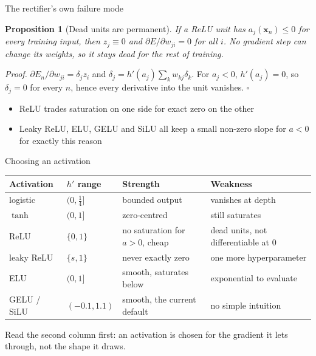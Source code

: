 \documentclass[aspectratio=169, 11pt]{beamer}
\newtheorem{propx}[theorem]{Proposition}
\newcommand{\src}[3]{}      %
\newcommand{\nosrc}{}       %
\begin{document}
\begin{frame}{The rectifier's own failure mode}
  \src{bishop2024}{section}{6.2.3}
  \vspace{0.2em}
  \begin{propx}[Dead units are permanent]
    {\small If a ReLU unit has $a_j(\mathbf{x}_n)\leq 0$ for
    \alert{every} training input, then $z_j\equiv 0$ and
    $\partial E/\partial w_{ji}=0$ for all $i$. No gradient step can
    change its weights, so it stays dead for the rest of training.}
  \end{propx}
  \vspace{0.2em}
  {\footnotesize
  \emph{Proof.} $\partial E_n/\partial w_{ji}
  = \delta_j z_i$ and $\delta_j = h'(a_j)\sum_k w_{kj}\delta_k$.
  For $a_j<0$, $h'(a_j)=0$, so $\delta_j=0$ for every $n$, hence every
  derivative into the unit vanishes. \hfill$\square$}
  \vspace{0.3em}
  {\small
  \begin{itemize}\setlength{\itemsep}{3pt}
    \item ReLU trades \alert{saturation on one side} for
          \alert{exact zero on the other}
    \item Leaky ReLU, ELU, GELU and SiLU all keep a small non-zero
          slope for $a<0$ for exactly this reason
  \end{itemize}}
\end{frame}

\begin{frame}{Choosing an activation}
  \nosrc
  \vspace{0.05em}
  \centering
  \renewcommand{\arraystretch}{1.25}
  {\footnotesize
  \begin{tabular}{p{} p{}
                  p{} p{}}
    \textbf{Activation} & \textbf{$h'$ range} & \textbf{Strength}
      & \textbf{Weakness}\\
    \hline
    logistic & $(0,\tfrac14]$ & bounded output
      & vanishes at depth\\
    $\tanh$ & $(0,1]$ & zero-centred
      & still saturates\\
    ReLU & $\{0,1\}$ & no saturation for $a>0$, cheap
      & dead units, not differentiable at $0$\\
    leaky ReLU & $\{s,1\}$ & never exactly zero
      & one more hyperparameter\\
    ELU & $(0,1]$ & smooth, saturates below
      & exponential to evaluate\\
    GELU / SiLU & $(-0.1,1.1)$ & smooth, the current default
      & no simple intuition\\
    \hline
  \end{tabular}}
  \vspace{0.05em}
  {\small Read the second column first: an activation is chosen for the
  \alert{gradient it lets through}, not the shape it draws.}
\end{frame}
\end{document}

